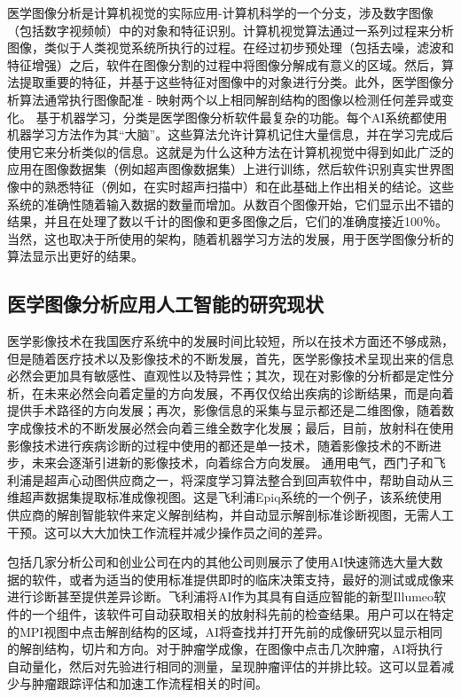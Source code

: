 医学图像分析是计算机视觉的实际应用-计算机科学的一个分支，涉及数字图像（包括数字视频帧）中的对象和特征识别。计算机视觉算法通过一系列过程来分析图像，类似于人类视觉系统所执行的过程。在经过初步预处理（包括去噪，滤波和特征增强）之后，软件在图像分割的过程中将图像分解成有意义的区域。然后，算法提取重要的特征，并基于这些特征对图像中的对象进行分类。此外，医学图像分析算法通常执行图像配准 - 映射两个以上相同解剖结构的图像以检测任何差异或变化。
基于机器学习，分类是医学图像分析软件最复杂的功能。每个AI系统都使用机器学习方法作为其“大脑”。这些算法允许计算机记住大量信息，并在学习完成后使用它来分析类似的信息。这就是为什么这种方法在计算机视觉中得到如此广泛的应用在图像数据集（例如超声图像数据集）上进行训练，然后软件识别真实世界图像中的熟悉特征（例如，在实时超声扫描中）和在此基础上作出相关的结论。这些系统的准确性随着输入数据的数量而增加。从数百个图像开始，它们显示出不错的结果，并且在处理了数以千计的图像和更多图像之后，它们的准确度接近100％。当然，这也取决于所使用的架构，随着机器学习方法的发展，用于医学图像分析的算法显示出更好的结果。

\subsection{医学图像分析应用人工智能的研究现状}

医学影像技术在我国医疗系统中的发展时间比较短，所以在技术方面还不够成熟，但是随着医疗技术以及影像技术的不断发展，首先，医学影像技术呈现出来的信息必然会更加具有敏感性、直观性以及特异性；其次，现在对影像的分析都是定性分析，在未来必然会向着定量的方向发展，不再仅仅给出疾病的诊断结果，而是向着提供手术路径的方向发展；再次，影像信息的采集与显示都还是二维图像，随着数字成像技术的不断发展必然会向着三维全数字化发展；最后，目前，放射科在使用影像技术进行疾病诊断的过程中使用的都还是单一技术，随着影像技术的不断进步，未来会逐渐引进新的影像技术，向着综合方向发展。 通用电气，西门子和飞利浦是超声心动图供应商之一，将深度学习算法整合到回声软件中，帮助自动从三维超声数据集提取标准成像视图。这是飞利浦Epiq系统的一个例子，该系统使用供应商的解剖智能软件来定义解剖结构，并自动显示解剖标准诊断视图，无需人工干预。这可以大大加快工作流程并减少操作员之间的差异。

包括几家分析公司和创业公司在内的其他公司则展示了使用AI快速筛选大量大数据的软件，或者为适当的使用标准提供即时的临床决策支持，最好的测试或成像来进行诊断甚至提供差异诊断。飞利浦将AI作为其具有自适应智能的新型Illumeo软件的一个组件，该软件可自动获取相关的放射科先前的检查结果。用户可以在特定的MPI视图中点击解剖结构的区域，AI将查找并打开先前的成像研究以显示相同的解剖结构，切片和方向。对于肿瘤学成像，在图像中点击几次肿瘤，AI将执行自动量化，然后对先验进行相同的测量，呈现肿瘤评估的并排比较。这可以显着减少与肿瘤跟踪评估和加速工作流程相关的时间。

